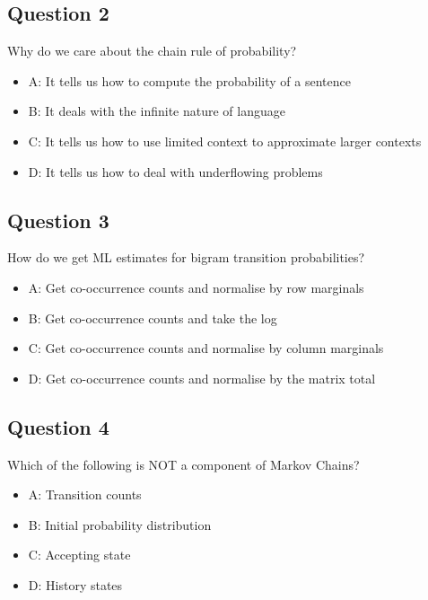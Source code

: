 \documentclass[
  11pt,
  british,
]{article}
\providecommand{\tightlist}{%
  \setlength{\itemsep}{0pt}\setlength{\parskip}{0pt}}
\begin{document}
\hypertarget{question-2-3}{%
\subsection{Question 2}\label{question-2-3}}

Why do we care about the chain rule of probability?

\begin{itemize}
\tightlist
\item
  A: It tells us how to compute the probability of a sentence
\item
  B: It deals with the infinite nature of language
\item
  C: It tells us how to use limited context to approximate larger
  contexts
\item
  D: It tells us how to deal with underflowing problems
\end{itemize}

\hypertarget{question-3-3}{%
\subsection{Question 3}\label{question-3-3}}

How do we get ML estimates for bigram transition probabilities?

\begin{itemize}
\tightlist
\item
  A: Get co-occurrence counts and normalise by row marginals
\item
  B: Get co-occurrence counts and take the log
\item
  C: Get co-occurrence counts and normalise by column marginals
\item
  D: Get co-occurrence counts and normalise by the matrix total
\end{itemize}

\hypertarget{question-4-3}{%
\subsection{Question 4}\label{question-4-3}}

Which of the following is NOT a component of Markov Chains?

\begin{itemize}
\tightlist
\item
  A: Transition counts
\item
  B: Initial probability distribution
\item
  C: Accepting state
\item
  D: History states
\end{itemize}
\end{document}
